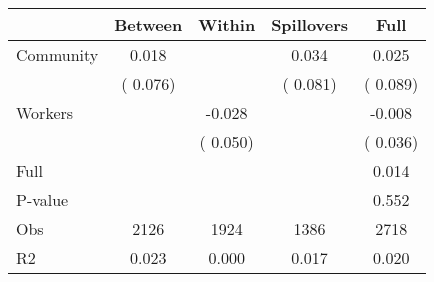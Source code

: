
\begin{tabular}{l*{4}{c}}\hline&\multicolumn{1}{c}{Between}&\multicolumn{1}{c}{Within}&\multicolumn{1}{c}{Spillovers}&\multicolumn{1}{c}{Full}\\ \hline
 Community             &              0.018      &                                               &        0.034 &         0.025                            \\ 
                               &        (       0.076)           &                                       &       (       0.081)     &      (       0.089)                                           \\ 
 Workers       &                                               &       -0.028    &                                &            -0.008                            \\ 
                               &                                               & (       0.050)                  &                                        &      (       0.036)                                           \\ 
\hline                                                                                                                                                                                                                                            
 Full                  &                                               &                                               &                                        &             0.014                                     \\ 
 P-value               &                                               &                                               &                                        &             0.552                                           \\ 
 Obs                   &               2126               &       1924                       &       1386                &              2718                                               \\ 
 R2                    &                      0.023              &              0.000                      &              0.017               &                     0.020                                              \\ 
\hline \end{tabular}                                                                                                                                                                                                              